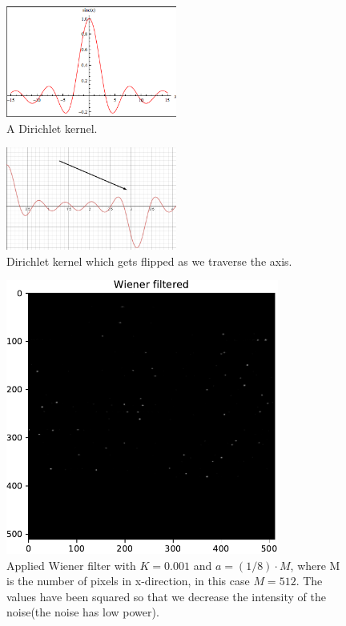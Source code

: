 {\begin{figure}[H]
    {\centering
        \includegraphics[width=0.5\textwidth]{sinc.png}
        \caption{A Dirichlet kernel.}
        \label{sincc}
    \par}
    \end{figure}

    \begin{figure}[H]
        {\centering
            \includegraphics[width=0.5\textwidth]{sincprob.png}
            \caption{Dirichlet kernel which gets flipped as we traverse the axis.}
            \label{sinccprob}
        \par}
        \end{figure}


\begin{figure}[H]
    {\centering
        \includegraphics[width=0.8\textwidth]{carttopol_trans_back2.pdf}
        \caption{Applied Wiener filter with $K = 0.001$ and $a = (1/8)\cdot M$, where M is the number of pixels in x-direction, in this case $M = 512$. The values have been squared so that we decrease the intensity of the noise(the noise has low power).}
        \label{changingsystem2}
    \par}
    \end{figure}
    
}
